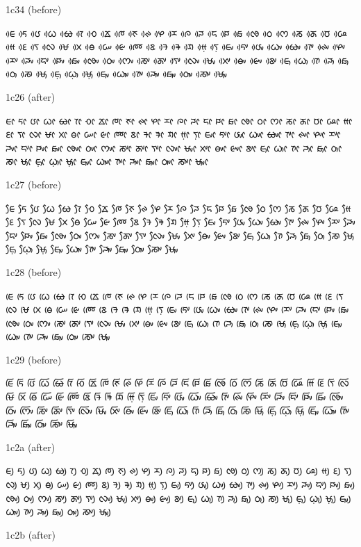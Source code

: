 \noindent
1c34 (before)

\noindent
ᰀᰴ ᰁᰴ ᰂᰴ ᰃᰴ ᰄᰴ ᰅᰴ ᰆᰴ ᰇᰴ ᰈᰴ ᰉᰴ ᰊᰴ ᰋᰴ ᰌᰴ ᰍᰴ ᰎᰴ ᰏᰴ ᰐᰴ ᰑᰴ ᰒᰴ ᰓᰴ ᰔᰴ ᰕᰴ ᰖᰴ ᰗᰴ ᰘᰴ ᰙᰴ ᰚᰴ ᰛᰴ ᰜᰴ ᰝᰴ ᰞᰴ ᰟᰴ ᰠᰴ ᰡᰴ ᰢᰴ ᰣᰴ ᱍᰴ ᱎᰴ ᱏᰴ ᰙ᰷ᰴ ᰛ᰷ᰴ ᰀᰤᰴ ᰁᰤᰴ ᰂᰤᰴ ᰃᰤᰴ ᰄᰤᰴ ᰅᰤᰴ ᰊᰤᰴ ᰋᰤᰴ ᰌᰤᰴ ᰎᰤᰴ ᰏᰤᰴ ᰐᰤᰴ ᰑᰤᰴ ᰒᰤᰴ ᰓᰤᰴ ᰔᰤᰴ ᰕᰤᰴ ᰖᰤᰴ ᰛᰤᰴ ᰜᰤᰴ ᰝᰤᰴ ᰞᰤᰴ ᰟᰤᰴ ᰡᰤᰴ ᰣᰤᰴ ᰀᰥᰴ ᰃᰥᰴ ᰅᰥᰴ ᰎᰥᰴ ᰑᰥᰴ ᰓᰥᰴ ᰕᰥᰴ ᰝᰥᰴ ᰀ᰷ᰥᰴ ᰃ᰷ᰥᰴ ᰝ᰷ᰥᰴ ᰀᰥᰤᰴ ᰃᰥᰤᰴ ᰅᰥᰤᰴ ᰎᰥᰤᰴ ᰑᰥᰤᰴ ᰓᰥᰤᰴ ᰕᰥᰤᰴ ᰝᰥᰤᰴ 

\noindent
1c26 (after)

\noindent
ᰀᰦ ᰁᰦ ᰂᰦ ᰃᰦ ᰄᰦ ᰅᰦ ᰆᰦ ᰇᰦ ᰈᰦ ᰉᰦ ᰊᰦ ᰋᰦ ᰌᰦ ᰍᰦ ᰎᰦ ᰏᰦ ᰐᰦ ᰑᰦ ᰒᰦ ᰓᰦ ᰔᰦ ᰕᰦ ᰖᰦ ᰗᰦ ᰘᰦ ᰙᰦ ᰚᰦ ᰛᰦ ᰜᰦ ᰝᰦ ᰞᰦ ᰟᰦ ᰠᰦ ᰡᰦ ᰢᰦ ᰣᰦ ᱍᰦ ᱎᰦ ᱏᰦ ᰙ᰷ᰦ ᰛ᰷ᰦ ᰀᰤᰦ ᰁᰤᰦ ᰂᰤᰦ ᰃᰤᰦ ᰄᰤᰦ ᰅᰤᰦ ᰊᰤᰦ ᰋᰤᰦ ᰌᰤᰦ ᰎᰤᰦ ᰏᰤᰦ ᰐᰤᰦ ᰑᰤᰦ ᰒᰤᰦ ᰓᰤᰦ ᰔᰤᰦ ᰕᰤᰦ ᰖᰤᰦ ᰛᰤᰦ ᰜᰤᰦ ᰝᰤᰦ ᰞᰤᰦ ᰟᰤᰦ ᰡᰤᰦ ᰣᰤᰦ ᰀᰥᰦ ᰃᰥᰦ ᰅᰥᰦ ᰎᰥᰦ ᰑᰥᰦ ᰓᰥᰦ ᰕᰥᰦ ᰝᰥᰦ ᰀ᰷ᰥᰦ ᰃ᰷ᰥᰦ ᰝ᰷ᰥᰦ ᰀᰥᰤᰦ ᰃᰥᰤᰦ ᰅᰥᰤᰦ ᰎᰥᰤᰦ ᰑᰥᰤᰦ ᰓᰥᰤᰦ ᰕᰥᰤᰦ ᰝᰥᰤᰦ 

\noindent
1c27 (before)

\noindent
ᰀᰧ ᰁᰧ ᰂᰧ ᰃᰧ ᰄᰧ ᰅᰧ ᰆᰧ ᰇᰧ ᰈᰧ ᰉᰧ ᰊᰧ ᰋᰧ ᰌᰧ ᰍᰧ ᰎᰧ ᰏᰧ ᰐᰧ ᰑᰧ ᰒᰧ ᰓᰧ ᰔᰧ ᰕᰧ ᰖᰧ ᰗᰧ ᰘᰧ ᰙᰧ ᰚᰧ ᰛᰧ ᰜᰧ ᰝᰧ ᰞᰧ ᰟᰧ ᰠᰧ ᰡᰧ ᰢᰧ ᰣᰧ ᱍᰧ ᱎᰧ ᱏᰧ ᰙ᰷ᰧ ᰛ᰷ᰧ ᰀᰤᰧ ᰁᰤᰧ ᰂᰤᰧ ᰃᰤᰧ ᰄᰤᰧ ᰅᰤᰧ ᰊᰤᰧ ᰋᰤᰧ ᰌᰤᰧ ᰎᰤᰧ ᰏᰤᰧ ᰐᰤᰧ ᰑᰤᰧ ᰒᰤᰧ ᰓᰤᰧ ᰔᰤᰧ ᰕᰤᰧ ᰖᰤᰧ ᰛᰤᰧ ᰜᰤᰧ ᰝᰤᰧ ᰞᰤᰧ ᰟᰤᰧ ᰡᰤᰧ ᰣᰤᰧ ᰀᰥᰧ ᰃᰥᰧ ᰅᰥᰧ ᰎᰥᰧ ᰑᰥᰧ ᰓᰥᰧ ᰕᰥᰧ ᰝᰥᰧ ᰀ᰷ᰥᰧ ᰃ᰷ᰥᰧ ᰝ᰷ᰥᰧ ᰀᰥᰤᰧ ᰃᰥᰤᰧ ᰅᰥᰤᰧ ᰎᰥᰤᰧ ᰑᰥᰤᰧ ᰓᰥᰤᰧ ᰕᰥᰤᰧ ᰝᰥᰤᰧ 

\noindent
1c28 (before)

\noindent
ᰀᰨ ᰁᰨ ᰂᰨ ᰃᰨ ᰄᰨ ᰅᰨ ᰆᰨ ᰇᰨ ᰈᰨ ᰉᰨ ᰊᰨ ᰋᰨ ᰌᰨ ᰍᰨ ᰎᰨ ᰏᰨ ᰐᰨ ᰑᰨ ᰒᰨ ᰓᰨ ᰔᰨ ᰕᰨ ᰖᰨ ᰗᰨ ᰘᰨ ᰙᰨ ᰚᰨ ᰛᰨ ᰜᰨ ᰝᰨ ᰞᰨ ᰟᰨ ᰠᰨ ᰡᰨ ᰢᰨ ᰣᰨ ᱍᰨ ᱎᰨ ᱏᰨ ᰙ᰷ᰨ ᰛ᰷ᰨ ᰀᰤᰨ ᰁᰤᰨ ᰂᰤᰨ ᰃᰤᰨ ᰄᰤᰨ ᰅᰤᰨ ᰊᰤᰨ ᰋᰤᰨ ᰌᰤᰨ ᰎᰤᰨ ᰏᰤᰨ ᰐᰤᰨ ᰑᰤᰨ ᰒᰤᰨ ᰓᰤᰨ ᰔᰤᰨ ᰕᰤᰨ ᰖᰤᰨ ᰛᰤᰨ ᰜᰤᰨ ᰝᰤᰨ ᰞᰤᰨ ᰟᰤᰨ ᰡᰤᰨ ᰣᰤᰨ ᰀᰥᰨ ᰃᰥᰨ ᰅᰥᰨ ᰎᰥᰨ ᰑᰥᰨ ᰓᰥᰨ ᰕᰥᰨ ᰝᰥᰨ ᰀ᰷ᰥᰨ ᰃ᰷ᰥᰨ ᰝ᰷ᰥᰨ ᰀᰥᰤᰨ ᰃᰥᰤᰨ ᰅᰥᰤᰨ ᰎᰥᰤᰨ ᰑᰥᰤᰨ ᰓᰥᰤᰨ ᰕᰥᰤᰨ ᰝᰥᰤᰨ 

\noindent
1c29 (before)

\noindent
ᰀᰩ ᰁᰩ ᰂᰩ ᰃᰩ ᰄᰩ ᰅᰩ ᰆᰩ ᰇᰩ ᰈᰩ ᰉᰩ ᰊᰩ ᰋᰩ ᰌᰩ ᰍᰩ ᰎᰩ ᰏᰩ ᰐᰩ ᰑᰩ ᰒᰩ ᰓᰩ ᰔᰩ ᰕᰩ ᰖᰩ ᰗᰩ ᰘᰩ ᰙᰩ ᰚᰩ ᰛᰩ ᰜᰩ ᰝᰩ ᰞᰩ ᰟᰩ ᰠᰩ ᰡᰩ ᰢᰩ ᰣᰩ ᱍᰩ ᱎᰩ ᱏᰩ ᰙ᰷ᰩ ᰛ᰷ᰩ ᰀᰤᰩ ᰁᰤᰩ ᰂᰤᰩ ᰃᰤᰩ ᰄᰤᰩ ᰅᰤᰩ ᰊᰤᰩ ᰋᰤᰩ ᰌᰤᰩ ᰎᰤᰩ ᰏᰤᰩ ᰐᰤᰩ ᰑᰤᰩ ᰒᰤᰩ ᰓᰤᰩ ᰔᰤᰩ ᰕᰤᰩ ᰖᰤᰩ ᰛᰤᰩ ᰜᰤᰩ ᰝᰤᰩ ᰞᰤᰩ ᰟᰤᰩ ᰡᰤᰩ ᰣᰤᰩ ᰀᰥᰩ ᰃᰥᰩ ᰅᰥᰩ ᰎᰥᰩ ᰑᰥᰩ ᰓᰥᰩ ᰕᰥᰩ ᰝᰥᰩ ᰀ᰷ᰥᰩ ᰃ᰷ᰥᰩ ᰝ᰷ᰥᰩ ᰀᰥᰤᰩ ᰃᰥᰤᰩ ᰅᰥᰤᰩ ᰎᰥᰤᰩ ᰑᰥᰤᰩ ᰓᰥᰤᰩ ᰕᰥᰤᰩ ᰝᰥᰤᰩ 

\noindent
1c2a (after)

\noindent
ᰀᰪ ᰁᰪ ᰂᰪ ᰃᰪ ᰄᰪ ᰅᰪ ᰆᰪ ᰇᰪ ᰈᰪ ᰉᰪ ᰊᰪ ᰋᰪ ᰌᰪ ᰍᰪ ᰎᰪ ᰏᰪ ᰐᰪ ᰑᰪ ᰒᰪ ᰓᰪ ᰔᰪ ᰕᰪ ᰖᰪ ᰗᰪ ᰘᰪ ᰙᰪ ᰚᰪ ᰛᰪ ᰜᰪ ᰝᰪ ᰞᰪ ᰟᰪ ᰠᰪ ᰡᰪ ᰢᰪ ᰣᰪ ᱍᰪ ᱎᰪ ᱏᰪ ᰙ᰷ᰪ ᰛ᰷ᰪ ᰀᰤᰪ ᰁᰤᰪ ᰂᰤᰪ ᰃᰤᰪ ᰄᰤᰪ ᰅᰤᰪ ᰊᰤᰪ ᰋᰤᰪ ᰌᰤᰪ ᰎᰤᰪ ᰏᰤᰪ ᰐᰤᰪ ᰑᰤᰪ ᰒᰤᰪ ᰓᰤᰪ ᰔᰤᰪ ᰕᰤᰪ ᰖᰤᰪ ᰛᰤᰪ ᰜᰤᰪ ᰝᰤᰪ ᰞᰤᰪ ᰟᰤᰪ ᰡᰤᰪ ᰣᰤᰪ ᰀᰥᰪ ᰃᰥᰪ ᰅᰥᰪ ᰎᰥᰪ ᰑᰥᰪ ᰓᰥᰪ ᰕᰥᰪ ᰝᰥᰪ ᰀ᰷ᰥᰪ ᰃ᰷ᰥᰪ ᰝ᰷ᰥᰪ ᰀᰥᰤᰪ ᰃᰥᰤᰪ ᰅᰥᰤᰪ ᰎᰥᰤᰪ ᰑᰥᰤᰪ ᰓᰥᰤᰪ ᰕᰥᰤᰪ ᰝᰥᰤᰪ 

\noindent
1c2b (after)

